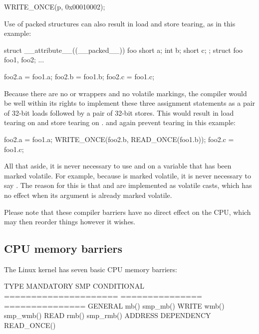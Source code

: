 \begin{itemize}
\begin{VerbatimU}
	WRITE_ONCE(p, 0x00010002);
\end{VerbatimU}

     Use of packed structures can also result in load and store tearing,
     as in this example:

\begin{VerbatimU}
	struct __attribute__((__packed__)) foo {
		short a;
		int b;
		short c;
	};
	struct foo foo1, foo2;
	...

	foo2.a = foo1.a;
	foo2.b = foo1.b;
	foo2.c = foo1.c;
\end{VerbatimU}

     Because there are no  or  wrappers and no
     volatile markings, the compiler would be well within its rights to
     implement these three assignment statements as a pair of 32-bit
     loads followed by a pair of 32-bit stores.
     This would result in load tearing on  and store tearing
     on .
      and  again prevent tearing in
     this example:

\begin{VerbatimU}
	foo2.a = foo1.a;
	WRITE_ONCE(foo2.b, READ_ONCE(foo1.b));
	foo2.c = foo1.c;
\end{VerbatimU}
\end{itemize}

All that aside, it is never necessary to use  and
 on a variable that has been marked volatile.
For example, because  is marked volatile, it is never necessary to
say .
The reason for this is that  and  are
implemented as volatile casts, which has no effect when its argument is
already marked volatile.

Please note that these compiler barriers have no direct effect on the CPU,
which may then reorder things however it wishes.


\subsection{CPU memory barriers}

The Linux kernel has seven basic CPU memory barriers:

\begin{VerbatimU}
	TYPE                  MANDATORY       SMP CONDITIONAL
	===================== =============== ===============
	GENERAL               mb()            smp_mb()
	WRITE                 wmb()           smp_wmb()
	READ                  rmb()           smp_rmb()
	ADDRESS DEPENDENCY                    READ_ONCE()
\end{VerbatimU}

